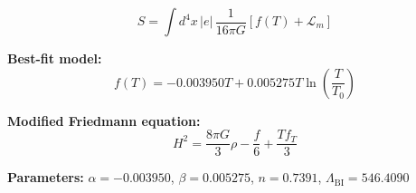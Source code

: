 
\begin{equation}
  S = \int d^4x \, |e| \, \frac{1}{16\pi G} \left[ f(T) + \mathcal{L}_m \right]
\end{equation}

\textbf{Best-fit model:}
\begin{equation}
  f(T) = -0.003950 T + 0.005275 T \ln\!\left(\frac{T}{T_0}\right)
\end{equation}

\textbf{Modified Friedmann equation:}
\begin{equation}
  H^2 = \frac{8\pi G}{3} \rho - \frac{f}{6} + \frac{T f_T}{3}
\end{equation}

\textbf{Parameters:}
$\alpha = -0.003950$, \quad
$\beta = 0.005275$, \quad
$n = 0.7391$, \quad
$\Lambda_{\text{BI}} = 546.4090$